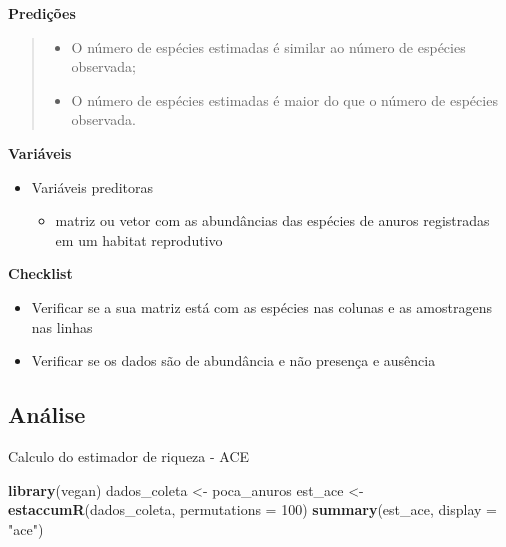 \documentclass[
]{book}
\newenvironment{Shaded}{\begin{snugshade}}{\end{snugshade}}
\newcommand{\DataTypeTok}[1]{\textcolor[rgb]{0.13,0.29,0.53}{#1}}
\newcommand{\DecValTok}[1]{\textcolor[rgb]{0.00,0.00,0.81}{#1}}
\newcommand{\KeywordTok}[1]{\textcolor[rgb]{0.13,0.29,0.53}{\textbf{#1}}}
\newcommand{\NormalTok}[1]{#1}
\newcommand{\StringTok}[1]{\textcolor[rgb]{0.31,0.60,0.02}{#1}}
\providecommand{\tightlist}{%
  \setlength{\itemsep}{0pt}\setlength{\parskip}{0pt}}
\begin{document}
\textbf{Predições}

\begin{quote}
\begin{itemize}
\tightlist
\item
  O número de espécies estimadas é similar ao número de espécies observada;
\item
  O número de espécies estimadas é maior do que o número de espécies observada.
\end{itemize}
\end{quote}

\textbf{Variáveis}

\begin{itemize}
\tightlist
\item
  Variáveis preditoras

  \begin{itemize}
  \tightlist
  \item
    matriz ou vetor com as abundâncias das espécies de anuros registradas em um habitat reprodutivo
  \end{itemize}
\end{itemize}

\textbf{Checklist}

\begin{itemize}
\tightlist
\item
  Verificar se a sua matriz está com as espécies nas colunas e as amostragens nas linhas
\item
  Verificar se os dados são de abundância e não presença e ausência
\end{itemize}

\hypertarget{anuxe1lise-1}{%
\subsection{Análise}\label{anuxe1lise-1}}

Calculo do estimador de riqueza - ACE

\begin{Shaded}
\begin{Highlighting}[]
\KeywordTok{library}\NormalTok{(vegan)}
\NormalTok{dados_coleta <-}\StringTok{ }\NormalTok{poca_anuros}
\NormalTok{est_ace <-}\StringTok{ }\KeywordTok{estaccumR}\NormalTok{(dados_coleta, }\DataTypeTok{permutations =} \DecValTok{100}\NormalTok{)}
\KeywordTok{summary}\NormalTok{(est_ace, }\DataTypeTok{display =} \StringTok{"ace"}\NormalTok{)}
\end{Highlighting}
\end{Shaded}
\end{document}
